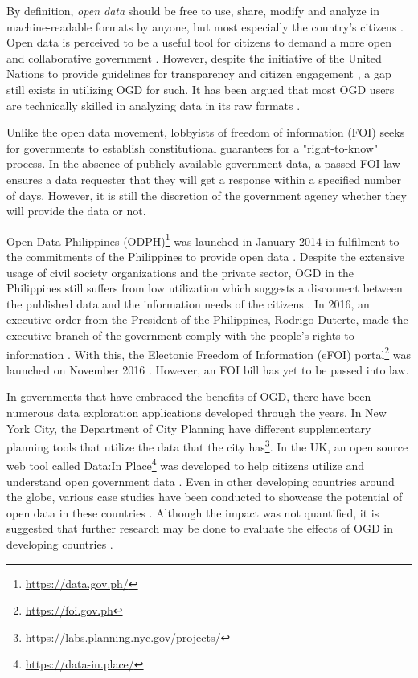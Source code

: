 \documentclass{sigchi}
\begin{document}
By definition, \textit{open data} should be free to use, share, modify and analyze in machine-readable formats by anyone, but most especially the country's citizens \cite{corrales2019knowledge, DAWES201615}. Open data is perceived to be a useful tool for citizens to demand a more open and collaborative government \cite{warwick2017}. However, despite the initiative of the United Nations to provide guidelines for transparency and citizen engagement \cite{UN2013}, a gap still exists in utilizing OGD for such. It has been argued that most OGD users are technically skilled in analyzing data in its raw formats \cite{DAWES201615}. 

Unlike the open data movement, lobbyists of freedom of information (FOI) seeks for governments to establish constitutional guarantees for a "right-to-know" process. In the absence of publicly available government data, a passed FOI law ensures a data requester that they will get a response within a specified number of days. However, it is still the discretion of the government agency whether they will provide the data or not. 

Open Data Philippines (ODPH)\footnote{\url{https://data.gov.ph/}} was launched in January 2014 in fulfilment to the commitments of the Philippines to provide open data \cite{ODPH2015}. Despite the extensive usage of civil society organizations and the private sector, OGD in the Philippines still suffers from low utilization which suggests a disconnect between the published data and the information needs of the citizens \cite{galindesZaplan2018}. In 2016, an executive order from the President of the Philippines, Rodrigo Duterte, made the executive branch of the government comply with the people's rights to information \cite{duterte2016}. With this, the Electonic Freedom of Information (eFOI) portal\footnote{\url{https://foi.gov.ph}} was launched on November 2016 \cite{cigaral2016}. However, an FOI bill has yet to be passed into law. 

In governments that have embraced the benefits of OGD, there have been numerous data exploration applications developed through the years. In New York City, the Department of City Planning have different supplementary planning tools that utilize the data that the city has\footnote{\url{https://labs.planning.nyc.gov/projects/}}. In the UK, an open source web tool called Data:In Place\footnote{\url{https://data-in.place/}} was developed to help citizens utilize and understand open government data \cite{puussaar2018making}. Even in other developing countries around the globe, various case studies have been conducted to showcase the potential of open data in these countries \cite{farahi2018}. Although the impact was not quantified, it is suggested that further research may be done to evaluate the effects of OGD in developing countries \cite{farahi2018}.
\end{document}

